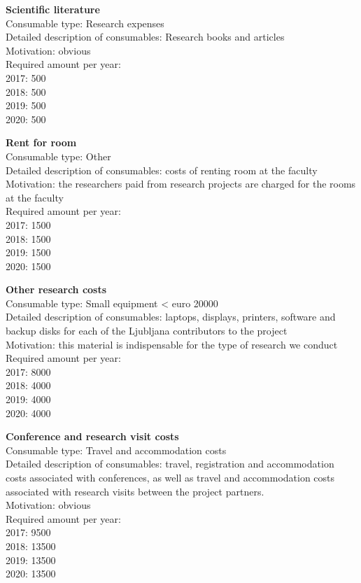\documentclass[11pt,dvipsnames,usenames,a4paper]{article}
\begin{document}
{\bf Scientific literature}\\
Consumable type: Research expenses\\
Detailed description of consumables: Research books and articles\\
Motivation: obvious\\
Required amount per year:\\
2017: 500\\
2018: 500\\
2019: 500\\
2020: 500

{\bf Rent for room}\\
Consumable type: Other\\
Detailed description of consumables: costs of renting room at the faculty \\
Motivation: the researchers paid from research projects are charged for the rooms at the faculty    \\
Required amount per year:\\
2017: 1500\\
2018: 1500\\
2019: 1500\\
2020: 1500

{\bf Other research costs}\\
Consumable type: Small equipment < euro 20000\\
Detailed description of consumables: laptops, displays, printers, software and backup disks for each of the Ljubljana contributors to the project\\
Motivation: this material is indispensable for the type of research we conduct\\
Required amount per year:\\
2017: 8000\\
2018: 4000\\
2019: 4000\\
2020: 4000

{\bf Conference and research visit costs}\\
Consumable type: Travel and accommodation costs\\
Detailed description of consumables: travel, registration and accommodation costs associated with conferences, as well as travel and accommodation costs associated with research visits between the project partners.\\
Motivation: obvious\\
Required amount per year:\\
2017: 9500\\
2018: 13500\\
2019: 13500\\
2020: 13500\\
\end{document}
